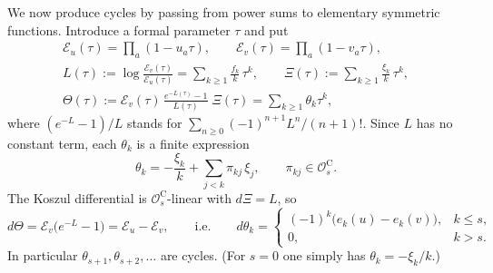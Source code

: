 \documentclass[11pt]{amsart}
\numberwithin{equation}{section}
\theoremstyle{definition}
\theoremstyle{remark}
\newcommand{\cO}{\mathcal{O}}
\newcommand{\Car}{\mathrm{C}}
\begin{document}
We now produce cycles by passing from power sums to elementary symmetric functions. Introduce a formal parameter $\tau$ and put
\begin{gather}
\label{eq:E-uv}\mathcal E_u(\tau)=\prod_a(1-u_a\tau),\qquad \mathcal E_v(\tau)=\prod_a(1-v_a\tau),\\
\label{eq:L-Xi}L(\tau):=\log\frac{\mathcal E_v(\tau)}{\mathcal E_u(\tau)}=\sum_{k\ge1}\frac{f_k}{k}\,\tau^k,\qquad
\Xi(\tau):=\sum_{k\ge1}\frac{\xi_k}{k}\,\tau^k,\\
\label{eq:Theta}\Theta(\tau):=\mathcal E_v(\tau)\,\frac{e^{-L(\tau)}-1}{L(\tau)}\;\Xi(\tau)=\sum_{k\ge1}\theta_k\tau^k,
\end{gather}
where $(e^{-L}-1)/L$ stands for $\sum_{n\ge0}(-1)^{n+1}L^n/(n+1)!$. Since $L$ has no constant term, each $\theta_k$ is a finite expression
\begin{equation}\label{eq:theta-k}
\theta_k=-\frac{\xi_k}{k}+\sum_{j<k}\pi_{kj}\,\xi_j,\qquad \pi_{kj}\in\cO^\Car_s .
\end{equation} The Koszul differential is $\cO^\Car_s$-linear with $d\Xi=L$, so
\begin{equation}\label{eq:dtheta}
d\Theta=\mathcal E_v\bigl(e^{-L}-1\bigr)=\mathcal E_u-\mathcal E_v,\qquad\text{i.e.}\qquad
d\theta_k=\begin{cases}(-1)^k\bigl(e_k(u)-e_k(v)\bigr),&k\le s,\\ 0,&k>s.\end{cases}
\end{equation}
In particular $\theta_{s+1},\theta_{s+2},\dots$ are cycles. (For $s=0$ one simply has $\theta_k=-\xi_k/k$.)
\end{document}
